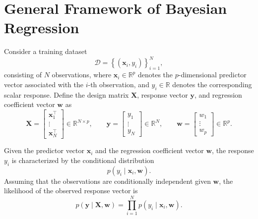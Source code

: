 \documentclass[../../Bayesian_Inference.tex]{subfiles}
\begin{document}
\section{General Framework of Bayesian Regression}

Consider a training dataset
\[
    \mathcal{D} = \left\{(\bm{x}_i,y_i)\right\}_{i=1}^{N},
\]
consisting of $N$ observations, where $\bm{x}_i \in \mathbb{R}^{p}$ denotes the $p$-dimensional predictor vector associated with the $i$-th observation, and $y_i \in \mathbb{R}$ denotes the corresponding scalar response. Define the design matrix $\mathbf{X}$, response vector $\bm{y}$, and regression coefficient vector $\bm{w}$ as
\[
    \mathbf{X} =
    \begin{bmatrix}
        \bm{x}_1^{\top} \\
        \vdots \\
        \bm{x}_N^{\top}
    \end{bmatrix}
    \in \mathbb{R}^{N \times p},
    \qquad
    \bm{y} =
    \begin{bmatrix}
        y_1 \\
        \vdots \\
        y_N
    \end{bmatrix}
    \in \mathbb{R}^{N},
    \qquad
    \bm{w} =
    \begin{bmatrix}
        w_1 \\
        \vdots \\
        w_p
    \end{bmatrix}
    \in \mathbb{R}^{p}.
\]

Given the predictor vector $\bm{x}_i$ and the regression coefficient vector $\bm{w}$, the response $y_i$ is characterized by the conditional distribution
\[
    p(y_i \mid \bm{x}_i, \bm{w}).
\]
Assuming that the observations are conditionally independent given $\bm{w}$, the likelihood of the observed response vector is
\[
    p(\bm{y} \mid \mathbf{X}, \bm{w})
    =
    \prod_{i=1}^{N}
    p(y_i \mid \bm{x}_i, \bm{w}).    
\]
\end{document}
